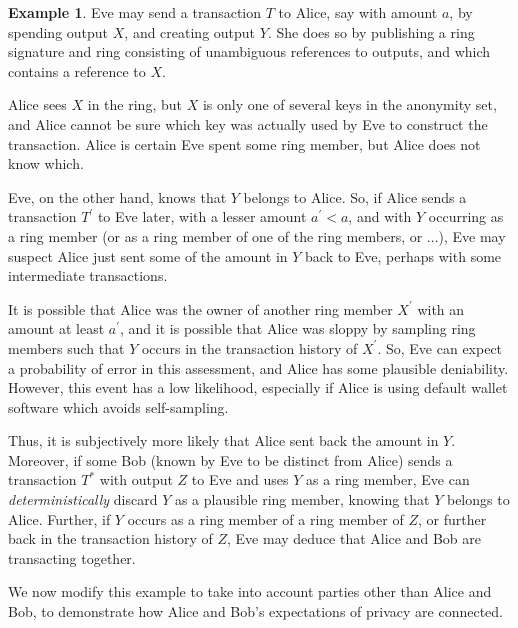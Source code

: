 \documentclass{article}
\theoremstyle{definition}
\newtheorem{example}{Example}
\begin{document}
\begin{example}
Eve may send a transaction $T$ to Alice, say with amount $a$, by spending output $X$, and creating output $Y$.
She does so by publishing a ring signature and ring consisting of unambiguous references to outputs, and which contains a reference to $X$.

Alice sees $X$ in the ring, but $X$ is only one of several keys in the anonymity set, and Alice cannot be sure which key was actually used by Eve to construct the transaction.
Alice is certain Eve spent some ring member, but Alice does not know which.

Eve, on the other hand, knows that $Y$ belongs to Alice.
So, if Alice sends a transaction $T^\prime$ to Eve later, with a lesser amount $a^\prime < a$, and with $Y$ occurring as a ring member (or as a ring member of one of the ring members, or ...), Eve may suspect Alice just sent some of the amount in $Y$ back to Eve, perhaps with some intermediate transactions.

It is possible that Alice was the owner of another ring member $X^\prime$ with an amount at least $a^\prime$, and it is possible that Alice was sloppy by sampling ring members such that $Y$ occurs in the transaction history of $X^\prime$.
So, Eve can expect a probability of error in this assessment, and Alice has some plausible deniability.
However, this event has a low likelihood, especially if Alice is using default wallet software which avoids self-sampling.

Thus, it is subjectively more likely that Alice sent back the amount in $Y$.
Moreover, if some Bob (known by Eve to be distinct from Alice) sends a transaction $T^*$ with output $Z$ to Eve and uses $Y$ as a ring member, Eve can \textit{deterministically} discard $Y$ as a plausible ring member, knowing that $Y$ belongs to Alice.
Further, if $Y$ occurs as a ring member of a ring member of $Z$, or further back in the transaction history of $Z$, Eve may deduce that Alice and Bob are transacting together.
\end{example}

We now modify this example to take into account parties other than Alice and Bob, to demonstrate how Alice and Bob's expectations of privacy are connected.
\end{document}
